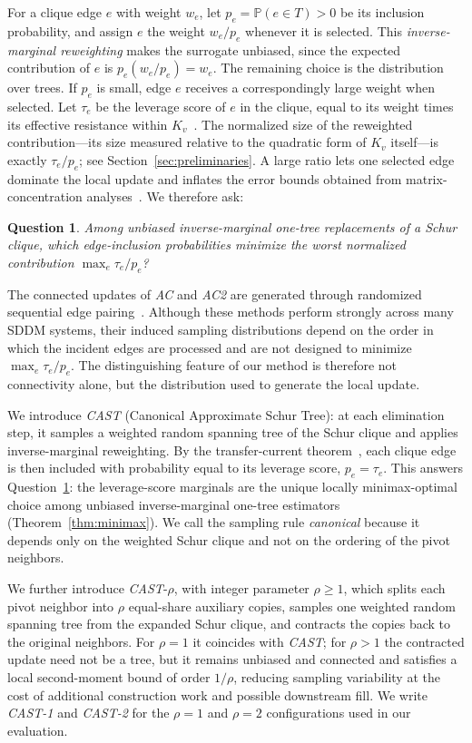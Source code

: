 \documentclass{article}
\newcommand{\CAST}{\textit{CAST}\xspace}
\newcommand{\CASTone}{\textit{CAST-1}\xspace}
\newcommand{\CASTtwo}{\textit{CAST-2}\xspace}
\newcommand{\AC}{\textit{AC}\xspace}
\newcommand{\ACtwo}{\textit{AC2}\xspace}
\newcommand{\1}{\mathbbm{1}}
\theoremstyle{plain}
\newtheorem{question}[theorem]{Question}
\renewcommand{\Pr}[1]{\mathbb{P}\left(#1\right)}
\begin{document}
For a clique edge $e$ with weight $w_e$, let $p_e=\Pr{e\in T}>0$ be its
inclusion probability, and assign $e$ the weight $w_e/p_e$ whenever it is
selected. This \emph{inverse-marginal reweighting} makes the surrogate
unbiased, since the expected contribution of $e$ is $p_e(w_e/p_e)=w_e$. The remaining choice is the distribution over trees. If $p_e$ is small, edge $e$ receives a correspondingly large weight when selected. Let $\tau_e$ be the leverage score of $e$ in the clique, equal to its weight times its effective resistance within $K_v$~\cite{spielman2008graph}. The normalized size of the reweighted contribution---its size measured
relative to the quadratic form of $K_v$ itself---is exactly $\tau_e/p_e$; see Section~\ref{sec:preliminaries}. A large ratio lets one selected edge dominate the local update and inflates the error bounds obtained from matrix-concentration analyses~\cite{kyng2016approximate}. We therefore ask:

\begin{question}\label{que:1}
Among unbiased inverse-marginal one-tree replacements of a Schur clique, which edge-inclusion probabilities minimize the worst normalized contribution $\max_e \tau_e/p_e$?
\end{question}

The connected updates of \AC{} and \ACtwo{} are generated through randomized sequential edge pairing~\cite{AC}. Although these methods perform strongly across many SDDM systems, their induced sampling distributions depend on the order in which the incident edges are processed and are not designed to minimize $\max_e\tau_e/p_e$. The distinguishing feature of our method is therefore not connectivity alone, but the distribution used to generate the local update.

We introduce \emph{\CAST} (Canonical Approximate Schur Tree): at each
elimination step, it samples a weighted random spanning tree of the Schur clique and applies inverse-marginal reweighting. By the transfer-current theorem~\cite{lyons2003determinantal}, each clique edge is then included with probability equal to its leverage score, $p_e=\tau_e$. This answers Question~\ref{que:1}: the leverage-score marginals are the unique locally minimax-optimal choice among unbiased inverse-marginal one-tree estimators (Theorem~\ref{thm:minimax}).  We call the sampling rule \emph{canonical} because it depends only on the weighted Schur clique and not on the ordering of the pivot
neighbors.

We further introduce \CAST-$\rho$, with integer parameter $\rho\geq 1$, which splits each pivot neighbor into $\rho$ equal-share auxiliary copies, samples one weighted random spanning tree from the expanded Schur clique, and contracts the copies back to the original neighbors.  For $\rho=1$ it
coincides with \CAST{}; for $\rho>1$ the contracted update need not be a
tree, but it remains unbiased and connected and satisfies a local
second-moment bound of order $1/\rho$, reducing sampling variability at
the cost of additional construction work and possible downstream fill. We
write \CASTone{} and \CASTtwo{} for the $\rho=1$ and $\rho=2$
configurations used in our evaluation.
\end{document}
